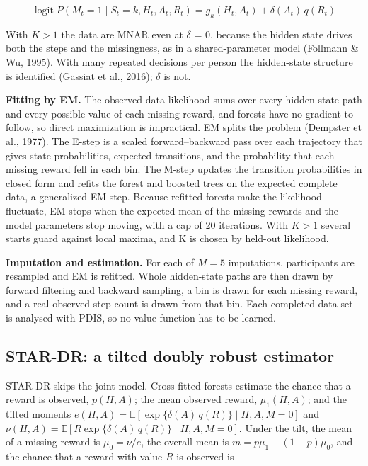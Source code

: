 \documentclass[12pt]{article}
\begin{document}
\begin{equation}\label{eq:miss}
\operatorname{logit}P(M_t=1\mid S_t=k,H_t,A_t,R_t)=g_k(H_t,A_t)+\delta(A_t)\,q(R_t)
\end{equation}

With $K>1$ the data are MNAR even at $\delta$ = 0, because the hidden state drives both the steps and the missingness, as in a shared-parameter model (Follmann \& Wu, 1995). With many repeated decisions per person the hidden-state structure is identified (Gassiat et al., 2016); $\delta$ is not.

\textbf{Fitting by EM.} The observed-data likelihood sums over every hidden-state path and every possible value of each missing reward, and forests have no gradient to follow, so direct maximization is impractical. EM splits the problem (Dempster et al., 1977). The E-step is a scaled forward--backward pass over each trajectory that gives state probabilities, expected transitions, and the probability that each missing reward fell in each bin. The M-step updates the transition probabilities in closed form and refits the forest and boosted trees on the expected complete data, a generalized EM step. Because refitted forests make the likelihood fluctuate, EM stops when the expected mean of the missing rewards and the model parameters stop moving, with a cap of 20 iterations. With $K>1$ several starts guard against local maxima, and K is chosen by held-out likelihood.

\textbf{Imputation and estimation.} For each of $M=5$ imputations, participants are resampled and EM is refitted. Whole hidden-state paths are then drawn by forward filtering and backward sampling, a bin is drawn for each missing reward, and a real observed step count is drawn from that bin. Each completed data set is analysed with PDIS, so no value function has to be learned.

\subsection{STAR-DR: a tilted doubly robust estimator}

STAR-DR skips the joint model. Cross-fitted forests estimate the chance that a reward is observed, $p(H,A)$; the mean observed reward, $\mu_1(H,A)$; and the tilted moments $e(H,A)=\mathbb{E}[\exp\{\delta(A)\,q(R)\}\mid H,A,M=0]$ and $\nu(H,A)=\mathbb{E}[R\exp\{\delta(A)\,q(R)\}\mid H,A,M=0]$. Under the tilt, the mean of a missing reward is $\mu_0=\nu/e$, the overall mean is $m=p\mu_1+(1-p)\mu_0$, and the chance that a reward with value $R$ is observed is
\end{document}
